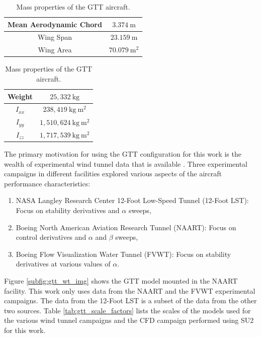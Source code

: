 \begin{table}
\parbox{0.5\textwidth}{
\centering
    \renewcommand{\arraystretch}{1.2}
    \captionsetup{justification=centering}
    \begin{tabular}{|c|c|}
        \hline
        Mean Aerodynamic Chord & $3.374~\mathrm{m}$ \\ \hline
        Wing Span & $23.159~\mathrm{m}$ \\ \hline
        Wing Area & $70.079~\mathrm{m^2}$ \\ \hline
    \end{tabular}
    \caption{Aerodynamic reference dimensions for the GTT aircraft.} 
    \label{tab:gtt_ref_dim}
}
\parbox{0.5\textwidth}{
\centering
    \renewcommand{\arraystretch}{1.2}
    \captionsetup{justification=centering}
    \begin{tabular}{|c|c|}
        \hline
        Weight & $25,332~\mathrm{kg}$ \\ \hline
        $I_{xx}$ & $238,419~\mathrm{kg~m^2}$ \\ \hline
        $I_{yy}$ & $1,510,624~\mathrm{kg~m^2}$ \\ \hline
        $I_{zz}$ & $1,717,539~\mathrm{kg~m^2}$ \\ \hline
    \end{tabular}
    \caption{Mass properties of the GTT aircraft.}
    \label{tab:gtt_mass_prop}
}
\end{table}

The primary motivation for using the GTT configuration for this work is the wealth of experimental wind tunnel data that is available \cite{cunningham_preliminary_2018}. 
Three experimental campaigns in different facilities explored various aspects of the aircraft performance characteristics:
\begin{enumerate}
    \item NASA Langley Research Center 12-Foot Low-Speed Tunnel (12-Foot LST): Focus on stability derivatives and $\alpha$ sweeps,
    \item Boeing North American Aviation Research Tunnel (NAART): Focus on control derivatives and $\alpha$ and $\beta$ sweeps,
    \item Boeing Flow Visualization Water Tunnel (FVWT): Focus on stability derivatives at various values of $\alpha$.
\end{enumerate}
Figure \ref{subfig:gtt_wt_img} shows the GTT model mounted in the NAART facility.
This work only uses data from the NAART and the FVWT experimental campaigns.
The data from the 12-Foot LST is a subset of the data from the other two sources. 
Table \ref{tab:gtt_scale_factors} lists the scales of the models used for the various wind tunnel campaigns and the CFD campaign performed using SU2 for this work. 

